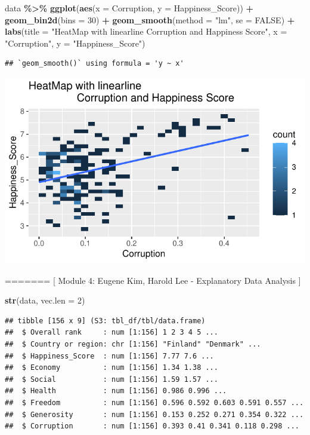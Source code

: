 \documentclass[
  11pt,
]{article}
\newenvironment{Shaded}{\begin{snugshade}}{\end{snugshade}}
\newcommand{\AttributeTok}[1]{\textcolor[rgb]{0.13,0.29,0.53}{#1}}
\newcommand{\ConstantTok}[1]{\textcolor[rgb]{0.56,0.35,0.01}{#1}}
\newcommand{\DecValTok}[1]{\textcolor[rgb]{0.00,0.00,0.81}{#1}}
\newcommand{\FunctionTok}[1]{\textcolor[rgb]{0.13,0.29,0.53}{\textbf{#1}}}
\newcommand{\NormalTok}[1]{#1}
\newcommand{\SpecialCharTok}[1]{\textcolor[rgb]{0.81,0.36,0.00}{\textbf{#1}}}
\newcommand{\StringTok}[1]{\textcolor[rgb]{0.31,0.60,0.02}{#1}}
\begin{document}
\begin{Shaded}
\begin{Highlighting}[]
\NormalTok{data }\SpecialCharTok{\%\textgreater{}\%}
\FunctionTok{ggplot}\NormalTok{(}\FunctionTok{aes}\NormalTok{(}\AttributeTok{x =}\NormalTok{ Corruption, }\AttributeTok{y =}\NormalTok{ Happiness\_Score)) }\SpecialCharTok{+}
  \FunctionTok{geom\_bin2d}\NormalTok{(}\AttributeTok{bins =} \DecValTok{30}\NormalTok{) }\SpecialCharTok{+}  
  \FunctionTok{geom\_smooth}\NormalTok{(}\AttributeTok{method =} \StringTok{"lm"}\NormalTok{, }\AttributeTok{se =} \ConstantTok{FALSE}\NormalTok{) }\SpecialCharTok{+} 
  \FunctionTok{labs}\NormalTok{(}\AttributeTok{title =} \StringTok{"HeatMap with linearline}
\StringTok{                Corruption and Happiness Score"}\NormalTok{, }
           \AttributeTok{x =} \StringTok{"Corruption"}\NormalTok{, }\AttributeTok{y =} \StringTok{"Happiness\_Score"}\NormalTok{)}
\end{Highlighting}
\end{Shaded}

\begin{verbatim}
## `geom_smooth()` using formula = 'y ~ x'
\end{verbatim}

\begin{center}\includegraphics[width=0.7\linewidth]{Group_project_2_files/figure-latex/unnamed-chunk-18-1} \end{center}

======= {[} Module 4: Eugene Kim, Harold Lee - Explanatory Data Analysis
{]}

\begin{Shaded}
\begin{Highlighting}[]
\FunctionTok{str}\NormalTok{(data, }\AttributeTok{vec.len =} \DecValTok{2}\NormalTok{)}
\end{Highlighting}
\end{Shaded}

\begin{verbatim}
## tibble [156 x 9] (S3: tbl_df/tbl/data.frame)
##  $ Overall rank     : num [1:156] 1 2 3 4 5 ...
##  $ Country or region: chr [1:156] "Finland" "Denmark" ...
##  $ Happiness_Score  : num [1:156] 7.77 7.6 ...
##  $ Economy          : num [1:156] 1.34 1.38 ...
##  $ Social           : num [1:156] 1.59 1.57 ...
##  $ Health           : num [1:156] 0.986 0.996 ...
##  $ Freedom          : num [1:156] 0.596 0.592 0.603 0.591 0.557 ...
##  $ Generosity       : num [1:156] 0.153 0.252 0.271 0.354 0.322 ...
##  $ Corruption       : num [1:156] 0.393 0.41 0.341 0.118 0.298 ...
\end{verbatim}
\end{document}
